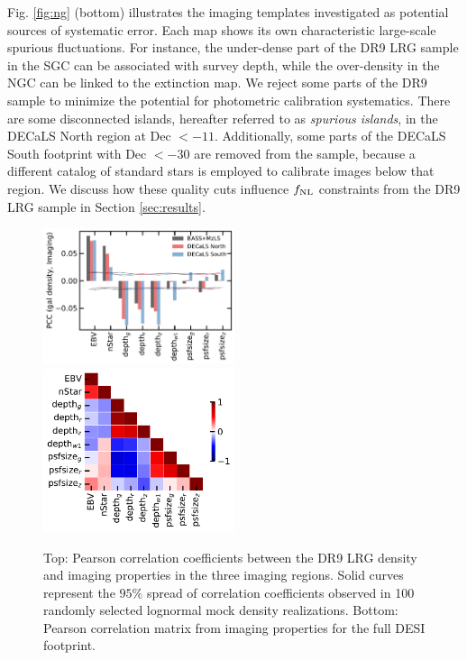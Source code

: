 Fig. \ref{fig:ng} (bottom) illustrates the imaging templates investigated as potential sources of systematic error. Each map shows its own characteristic large-scale spurious fluctuations. For instance, the under-dense part of the DR9 LRG sample in the SGC can be associated with survey depth, while the over-density in the NGC can be linked to the extinction map. We reject some parts of the DR9 sample to minimize the potential for photometric calibration systematics. There are some disconnected islands, hereafter referred to as \textit{spurious islands}, in the DECaLS North region at Dec $< -11$. Additionally, some parts of the DECaLS South footprint with Dec $< -30$ are removed from the sample, because a different catalog of standard stars is employed to calibrate images below that region. We discuss how these quality cuts influence $f_{\rm NL}$ constraints from the DR9 LRG sample in Section \ref{sec:results}. 

\begin{figure}
 \includegraphics[width=0.5\textwidth]{figures/pcc.pdf} 
 \includegraphics[width=0.5\textwidth]{figures/pccx.pdf}  
 \caption{Top: Pearson correlation coefficients between the DR9 LRG density and imaging properties in the three imaging regions. Solid curves represent the $95\%$ spread of correlation coefficients observed in 100 randomly selected lognormal mock density realizations. Bottom: Pearson correlation matrix from imaging properties for the full DESI footprint.}
 \label{fig:pcc}
\end{figure}

